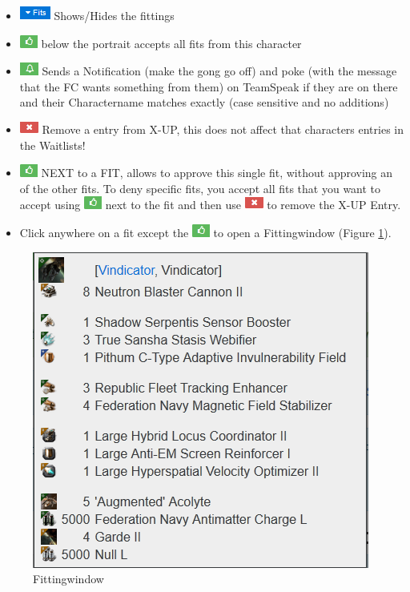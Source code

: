 \documentclass[oneside,a4paper]{article}
\newcommand{\piccross}{\includegraphics{cross.png}\xspace}
\begin{document}
\begin{itemize}
	\item \includegraphics{fits.png} Shows/Hides the fittings
	\item \includegraphics{thumbup.png} below the portrait accepts all fits from this character
	\item \includegraphics{bell.png} Sends a Notification (make the gong go off) and poke (with the message that the FC wants something from them) on TeamSpeak if they are on there and their Charactername matches exactly (case sensitive and no additions)
	\item \piccross Remove a entry from X-UP, this does not affect that characters entries in the Waitlists!
	\item \includegraphics{thumbup.png} NEXT to a FIT, allows to approve this single fit, without approving an of the other fits. To deny specific fits, you accept all fits that you want to accept using \includegraphics{thumbup.png} next to the fit and then use 
	\piccross to remove the X-UP Entry.
	\item Click anywhere on a fit except the \includegraphics{thumbup.png} to open a Fittingwindow (Figure \ref{pic:fittingwindow}).
\end{itemize}
\begin{figure}
	\centering
	\caption{Fittingwindow}
	\label{pic:fittingwindow}
	\includegraphics[]{fittingwindow-example.png}
\end{figure}
\end{document}
